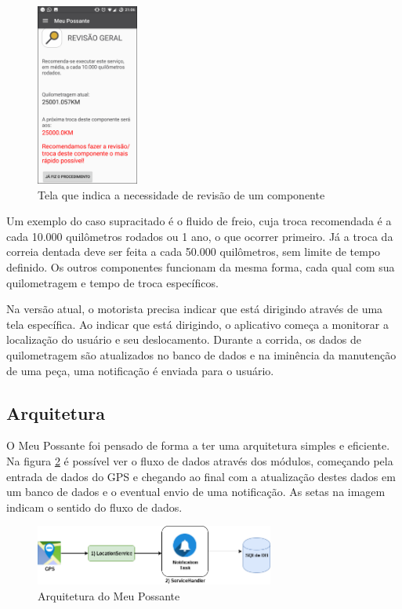 \begin{figure}[h]
\centering
\includegraphics[width=0.3\textwidth]{images/meu-possante-tela-componente.png}
\caption{Tela que indica a necessidade de revisão de um componente}
\label{meu-possante-tela-componente}
\end{figure}

Um exemplo do caso supracitado é o fluido de freio, cuja troca recomendada é a cada
10.000 quilômetros rodados ou 1 ano, o que ocorrer primeiro. Já a troca da correia
dentada deve ser feita a cada 50.000 quilômetros, sem limite de tempo definido. Os
outros componentes funcionam da mesma forma, cada qual com sua quilometragem e
tempo de troca específicos.

Na versão atual, o motorista precisa indicar que está dirigindo através de uma tela
específica. Ao indicar que está dirigindo, o aplicativo começa a monitorar a localização
do usuário e seu deslocamento. Durante a corrida, os dados de quilometragem são atualizados
no banco de dados e na iminência da manutenção de uma peça, uma notificação é enviada para o
usuário.

\subsection{Arquitetura}
\label{meupossante-app}

O Meu Possante foi pensado de forma a ter uma arquitetura simples e eficiente. Na figura
\ref{meu-possante-arquitetura} é possível ver o fluxo de dados através dos módulos, começando pela
entrada de dados do GPS e chegando ao final com a atualização destes dados em um banco de dados
e o eventual envio de uma notificação. As setas na imagem indicam o sentido do fluxo de dados.

\begin{figure}[h]
  \centering
  \includegraphics[width=0.7\textwidth]{images/arquitetura-meu-possante.png}
  \caption{Arquitetura do Meu Possante}
  \label{meu-possante-arquitetura}
\end{figure}

